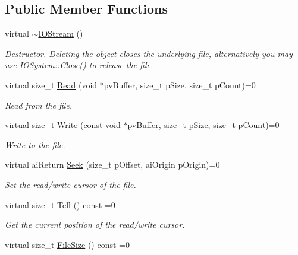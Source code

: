 \subsection*{Public Member Functions}
\begin{DoxyCompactItemize}
\item 
virtual \hyperlink{class_assimp_1_1_i_o_stream_a6cedc5033bf531bf14b97d1c9b788de8}{$\sim$\+I\+O\+Stream} ()\hypertarget{class_assimp_1_1_i_o_stream_a6cedc5033bf531bf14b97d1c9b788de8}{}\label{class_assimp_1_1_i_o_stream_a6cedc5033bf531bf14b97d1c9b788de8}

\begin{DoxyCompactList}\small\item\em Destructor. Deleting the object closes the underlying file, alternatively you may use \hyperlink{class_assimp_1_1_i_o_system_a8c334d60f04bceeb6bd0157d21723f3e}{I\+O\+System\+::\+Close()} to release the file. \end{DoxyCompactList}\item 
virtual size\+\_\+t \hyperlink{class_assimp_1_1_i_o_stream_ae376f641020989d61863b9c6f55c7abf}{Read} (void $\ast$pv\+Buffer, size\+\_\+t p\+Size, size\+\_\+t p\+Count)=0
\begin{DoxyCompactList}\small\item\em Read from the file. \end{DoxyCompactList}\item 
virtual size\+\_\+t \hyperlink{class_assimp_1_1_i_o_stream_ad0ca4aae1b8c4d00db391ac3a4171f7b}{Write} (const void $\ast$pv\+Buffer, size\+\_\+t p\+Size, size\+\_\+t p\+Count)=0
\begin{DoxyCompactList}\small\item\em Write to the file. \end{DoxyCompactList}\item 
virtual ai\+Return \hyperlink{class_assimp_1_1_i_o_stream_a5ed0dddf418ab08cf3fc21f3f3032220}{Seek} (size\+\_\+t p\+Offset, ai\+Origin p\+Origin)=0
\begin{DoxyCompactList}\small\item\em Set the read/write cursor of the file. \end{DoxyCompactList}\item 
virtual size\+\_\+t \hyperlink{class_assimp_1_1_i_o_stream_ae67d60cc590d4c1eeff13f98e07ddb7e}{Tell} () const  =0
\begin{DoxyCompactList}\small\item\em Get the current position of the read/write cursor. \end{DoxyCompactList}\item 
virtual size\+\_\+t \hyperlink{class_assimp_1_1_i_o_stream_afe24267cfc75b3366029d8f712b72e43}{File\+Size} () const  =0\hypertarget{class_assimp_1_1_i_o_stream_afe24267cfc75b3366029d8f712b72e43}{}\label{class_assimp_1_1_i_o_stream_afe24267cfc75b3366029d8f712b72e43}


\end{DoxyCompactItemize}
